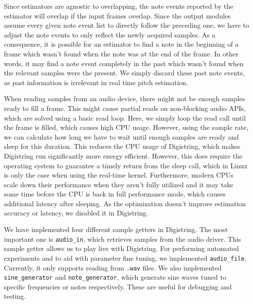 \documentclass[a4paper,10pt,twocolumn]{article}
\begin{document}
Since estimators are agnostic to overlapping, the note events reported by the estimator will overlap if the input frames overlap. Since the output modules assume every given note event list to directly follow the preceding one, we have to adjust the note events to only reflect the newly acquired samples. As a consequence, it is possible for an estimator to find a note in the beginning of a frame which wasn't found when the note was at the end of the frame. In other words, it may find a note event completely in the past which wasn't found when the relevant samples were the present. We simply discard these past note events, as past information is irrelevant in real time pitch estimation.

When reading samples from an audio device, there might not be enough samples ready to fill a frame. This might cause partial reads on non-blocking audio APIs, which are solved using a basic read loop. Here, we simply loop the read call until the frame is filled, which causes high CPU usage. However, using the sample rate, we can calculate how long we have to wait until enough samples are ready and sleep for this duration. This reduces the CPU usage of Digistring, which makes Digistring run significantly more energy efficient. However, this does require the operating system to guarantee a timely return from the sleep call, which in Linux is only the case when using the real-time kernel. Furthermore, modern CPUs scale down their performance when they aren't fully utilized and it may take some time before the CPU is back in full performance mode, which causes additional latency after sleeping. As the optimization doesn't improve estimation accuracy or latency, we disabled it in Digistring.

We have implemented four different sample getters in Digistring. The most important one is \texttt{audio\_in}, which retrieves samples from the audio driver. This sample getter allows us to play live with Digistring. For performing automated experiments and to aid with parameter fine tuning, we implemented \texttt{audio\_file}. Currently, it only supports reading from \texttt{.wav} files. We also implemented \texttt{sine\_generator} and \texttt{note\_generator}, which generate sine waves tuned to specific frequencies or notes respectively. These are useful for debugging and testing. %
\end{document}
